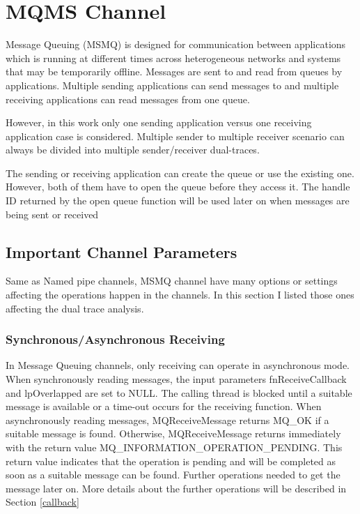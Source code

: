 \section{MQMS Channel}
Message Queuing (MSMQ) is designed for communication between applications which is running at different times across heterogeneous networks and systems that may be temporarily offline. Messages are sent to and read from queues by applications. Multiple sending applications can send messages to and multiple receiving applications can read messages from one queue. \cite{redkar2004pro}

However, in this work only one sending application versus one receiving application case is considered. Multiple sender to multiple receiver scenario can always be divided into multiple sender/receiver dual-traces. 

The sending or receiving application can create the queue or use the existing one. However, both of them have to open the queue before they access it. The handle ID returned by the open queue function will be used later on when messages are being sent or received

\subsection{Important Channel Parameters}    
Same as Named pipe channels, MSMQ channel have many options or settings affecting the operations happen in the channels. In this section I listed those ones affecting the dual trace analysis. 

\subsubsection{Synchronous/Asynchronous Receiving}
In Message Queuing channels, only receiving can operate in asynchronous mode. When synchronously reading messages, the input parameters fnReceiveCallback and lpOverlapped are set to NULL. The calling thread is blocked until a suitable message is available or a time-out occurs for the receiving function. When asynchronously reading messages, MQReceiveMessage returns MQ\_OK if a suitable message is found. Otherwise, MQReceiveMessage returns immediately with the return value MQ\_INFORMATION\_OPERATION\_PENDING. This return value indicates that the operation is pending and will be completed as soon as a suitable message can be found. Further operations needed to get the message later on. More details about the further operations will be described in Section \ref{callback}

